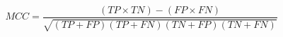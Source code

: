 \documentclass[preview]{standalone}
\begin{document}
{\large
\[
MCC=\frac{(TP\times TN)-(FP\times FN)}{\sqrt{(TP+FP)(TP+FN)(TN+FP)(TN+FN)}}
\]
}
\end{document}

